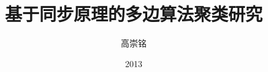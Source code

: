 \documentclass[bachelor]{uestcthesis}
\title{基于同步原理的多边算法聚类研究}
\author{高崇铭}
\date{2013}{4}{15}
\begin{document}
\newcommand{\red}[1]{{\textcolor{red}{{} #1}}}
\newcommand{\ud}{\,\mathrm{d}}
\newcommand{\bt}{\vrule width 0.85pt}
\newcommand{\CoSync}{\emph{CoSync}}
\newcommand{\Sync}{\emph{Sync}}
\newcommand{\cosync}{\emph{CoSync}}
\newcommand{\sync}{\emph{Sync}}
\makeatletter
\def\hlinew#1{%
  \noalign{\ifnum0=`}\fi\hrule \@height #1 \futurelet
   \reserved@a\@xhline}






\end{document}
